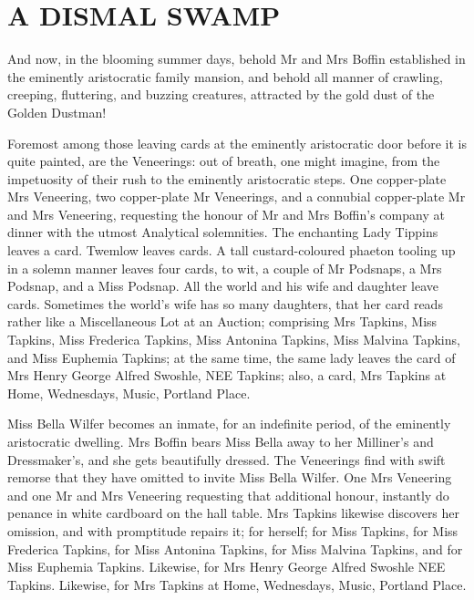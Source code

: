 
\chapter{A DISMAL SWAMP}

And now, in the blooming summer days, behold Mr and Mrs Boffin
established in the eminently aristocratic family mansion, and behold
all manner of crawling, creeping, fluttering, and buzzing creatures,
attracted by the gold dust of the Golden Dustman!

Foremost among those leaving cards at the eminently aristocratic door
before it is quite painted, are the Veneerings: out of breath, one
might imagine, from the impetuosity of their rush to the eminently
aristocratic steps. One copper-plate Mrs Veneering, two copper-plate
Mr Veneerings, and a connubial copper-plate Mr and Mrs Veneering,
requesting the honour of Mr and Mrs Boffin’s company at dinner with
the utmost Analytical solemnities. The enchanting Lady Tippins leaves a
card. Twemlow leaves cards. A tall custard-coloured phaeton tooling up
in a solemn manner leaves four cards, to wit, a couple of Mr Podsnaps, a
Mrs Podsnap, and a Miss Podsnap. All the world and his wife and daughter
leave cards. Sometimes the world’s wife has so many daughters, that her
card reads rather like a Miscellaneous Lot at an Auction; comprising Mrs
Tapkins, Miss Tapkins, Miss Frederica Tapkins, Miss Antonina Tapkins,
Miss Malvina Tapkins, and Miss Euphemia Tapkins; at the same time,
the same lady leaves the card of Mrs Henry George Alfred Swoshle, NEE
Tapkins; also, a card, Mrs Tapkins at Home, Wednesdays, Music, Portland
Place.

Miss Bella Wilfer becomes an inmate, for an indefinite period, of the
eminently aristocratic dwelling. Mrs Boffin bears Miss Bella away to
her Milliner’s and Dressmaker’s, and she gets beautifully dressed. The
Veneerings find with swift remorse that they have omitted to invite Miss
Bella Wilfer. One Mrs Veneering and one Mr and Mrs Veneering requesting
that additional honour, instantly do penance in white cardboard on
the hall table. Mrs Tapkins likewise discovers her omission, and
with promptitude repairs it; for herself; for Miss Tapkins, for Miss
Frederica Tapkins, for Miss Antonina Tapkins, for Miss Malvina Tapkins,
and for Miss Euphemia Tapkins. Likewise, for Mrs Henry George Alfred
Swoshle NEE Tapkins. Likewise, for Mrs Tapkins at Home, Wednesdays,
Music, Portland Place.


